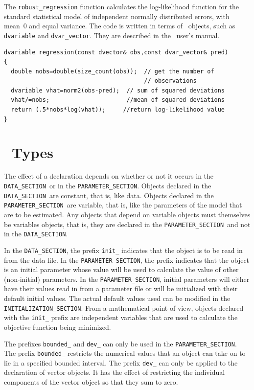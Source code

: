 \documentclass{admbmanual}
\newcommand\DS{\texttt{DATA\_SECTION}}
\newcommand\PS{\texttt{PARAMETER\_SECTION}}
\begin{document}
The \texttt{robust\_regression} function calculates the log-likelihood function
for the standard statistical model of independent
normally distributed errors, with mean~0 and equal variance.
The code is written in terms of \scAD\ objects, such as
\texttt{dvariable} and \texttt{dvar\_vector}. They are
described in the \scAD\ user's manual.
\begin{lstlisting}
dvariable regression(const dvector& obs,const dvar_vector& pred)
{
  double nobs=double(size_count(obs));  // get the number of
                                        // observations
  dvariable vhat=norm2(obs-pred);  // sum of squared deviations
  vhat/=nobs;                      //mean of squared deviations
  return (.5*nobs*log(vhat));     //return log-likelihood value
}
\end{lstlisting}


\chapter{\ADM\ Types}

The effect of a declaration depends on whether or not it occurs in the
\DS\ or in the \PS. Objects declared in the \DS\ are constant,
that is, like data. Objects declared in the \PS\ are variable,
that is, like the parameters of the model that are to be estimated.
Any objects that depend on variable objects must themselves be
variables objects, that is, they are declared in the \PS\ and
not in the \DS. 

In the \DS, the prefix \texttt{init\_} indicates
that the object is to be read in from the data file. 
In the
\PS, the prefix indicates that the object is an initial 
parameter whose value will be used to calculate the value of other
(non-initial) parameters. In the \PS, initial parameters
will either have their values read in from a parameter
file or will be initialized 
with their default initial values. The actual 
default values used can be modified in the \texttt{INITIALIZATION\_SECTION}.
From a mathematical point of view, objects declared with the
\texttt{init\_} prefix are independent variables that are used to
calculate the objective function being minimized.

The prefixes \texttt{bounded\_} and \texttt{dev\_} can only be used
in the \PS. The prefix \texttt{bounded\_} restricts the numerical values
that an object can take on to lie in a specified  bounded
interval. The prefix \texttt{dev\_} can only be applied to
the declaration of vector objects. It has the
effect of restricting the individual components
of the vector object so that they sum to zero.
 
\end{document}
